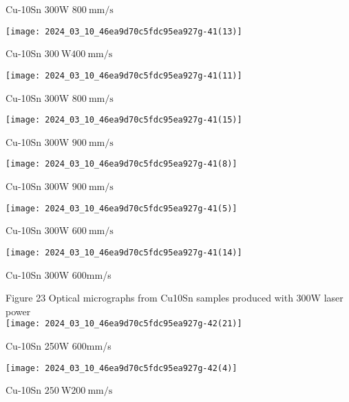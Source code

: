 \documentclass[10pt]{article}
\begin{document}
Cu-10Sn 300W $800 \mathrm{~mm} / \mathrm{s}$

\begin{center}
\texttt{[image: 2024\_03\_10\_46ea9d70c5fdc95ea927g-41(13)]}
\end{center}

Cu-10Sn $300 \mathrm{~W} 400 \mathrm{~mm} / \mathrm{s}$

\begin{center}
\texttt{[image: 2024\_03\_10\_46ea9d70c5fdc95ea927g-41(11)]}
\end{center}

Cu-10Sn 300W $800 \mathrm{~mm} / \mathrm{s}$

\begin{center}
\texttt{[image: 2024\_03\_10\_46ea9d70c5fdc95ea927g-41(15)]}
\end{center}

Cu-10Sn 300W $900 \mathrm{~mm} / \mathrm{s}$

\begin{center}
\texttt{[image: 2024\_03\_10\_46ea9d70c5fdc95ea927g-41(8)]}
\end{center}

Cu-10Sn 300W $900 \mathrm{~mm} / \mathrm{s}$

\begin{center}
\texttt{[image: 2024\_03\_10\_46ea9d70c5fdc95ea927g-41(5)]}
\end{center}

Cu-10Sn 300W $600 \mathrm{~mm} / \mathrm{s}$

\begin{center}
\texttt{[image: 2024\_03\_10\_46ea9d70c5fdc95ea927g-41(14)]}
\end{center}

Cu-10Sn 300W 600mm/s

Figure 23 Optical micrographs from Cu10Sn samples produced with 300W laser power\\
\texttt{[image: 2024\_03\_10\_46ea9d70c5fdc95ea927g-42(21)]}

Cu-10Sn 250W 600mm/s

\begin{center}
\texttt{[image: 2024\_03\_10\_46ea9d70c5fdc95ea927g-42(4)]}
\end{center}

Cu-10Sn $250 \mathrm{~W} 200 \mathrm{~mm} / \mathrm{s}$
\end{document}

